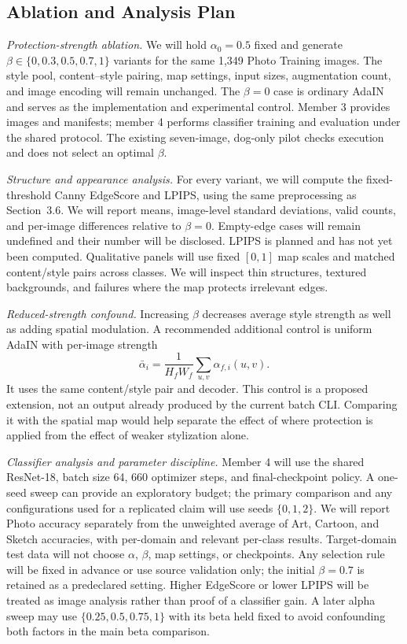 \subsection{Ablation and Analysis Plan}
\label{sec:m3_ablation_plan}

\textit{Protection-strength ablation.} We will hold $\alpha_0=0.5$ fixed and
generate $\beta\in\{0,0.3,0.5,0.7,1\}$ variants for the same 1,349 Photo Training
images. The style pool, content--style pairing, map settings, input sizes,
augmentation count, and image encoding will remain unchanged. The $\beta=0$
case is ordinary AdaIN and serves as the implementation and experimental control.
Member 3 provides images and manifests; member 4 performs classifier training and
evaluation under the shared protocol. The existing seven-image, dog-only pilot
checks execution and does not select an optimal $\beta$.

\textit{Structure and appearance analysis.} For every variant, we will compute
the fixed-threshold Canny EdgeScore and LPIPS, using the same preprocessing as
Section~3.6. We will report means, image-level standard deviations, valid counts,
and per-image differences relative to $\beta=0$. Empty-edge cases will remain
undefined and their number will be disclosed. LPIPS is planned and has not yet
been computed. Qualitative panels will use fixed $[0,1]$ map scales and matched
content/style pairs across classes. We will inspect thin structures, textured
backgrounds, and failures where the map protects irrelevant edges.

\textit{Reduced-strength confound.} Increasing $\beta$ decreases average style
strength as well as adding spatial modulation. A recommended additional control
is uniform AdaIN with per-image strength
\begin{equation}
\bar\alpha_i=\frac{1}{H_fW_f}\sum_{u,v}\alpha_{f,i}(u,v).
\label{eq:m3_mean_match}
\end{equation}
It uses the same content/style pair and decoder. This control is a proposed
extension, not an output already produced by the current batch CLI. Comparing
it with the spatial map would help separate the effect of where protection is
applied from the effect of weaker stylization alone.

\textit{Classifier analysis and parameter discipline.} Member 4 will use the
shared ResNet-18, batch size 64, 660 optimizer steps, and final-checkpoint policy.
A one-seed sweep can provide an exploratory budget; the primary comparison and
any configurations used for a replicated claim will use seeds $\{0,1,2\}$.
We will report Photo accuracy separately from the unweighted average of Art,
Cartoon, and Sketch accuracies, with per-domain and relevant per-class results.
Target-domain test data will not choose $\alpha$, $\beta$, map settings, or
checkpoints. Any selection rule will be fixed in advance or use source validation
only; the initial $\beta=0.7$ is retained as a predeclared setting. Higher EdgeScore
or lower LPIPS will be treated as image analysis rather than proof of a classifier
gain. A later alpha sweep may use $\{0.25,0.5,0.75,1\}$ with its beta held fixed
to avoid confounding both factors in the main beta comparison.
